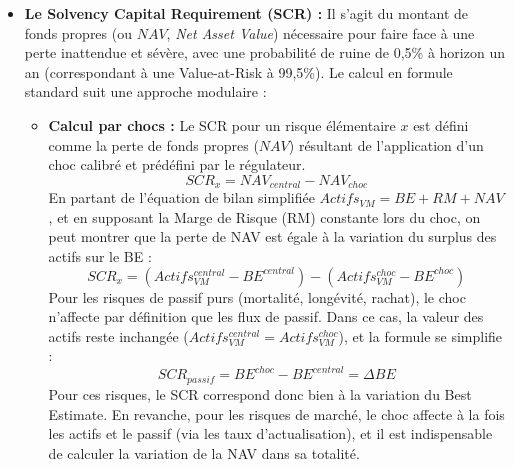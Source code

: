 \begin{itemize}
    \item \textbf{Le Solvency Capital Requirement (SCR) :} Il s'agit du montant de fonds propres (ou $NAV$, \textit{Net Asset Value}) nécessaire pour faire face à une perte inattendue et sévère, avec une probabilité de ruine de 0,5\% à horizon un an (correspondant à une Value-at-Risk à 99,5\%). Le calcul en formule standard suit une approche modulaire :
    \begin{itemize}
        \item \textbf{Calcul par chocs :} Le SCR pour un risque élémentaire $x$ est défini comme la perte de fonds propres ($NAV$) résultant de l'application d'un choc calibré et prédéfini par le régulateur.
        \begin{equation}
            SCR_{x} = NAV_{central} - NAV_{choc}
        \end{equation}
        En partant de l'équation de bilan simplifiée $Actifs_{VM} = BE + RM + NAV$, et en supposant la Marge de Risque (RM) constante lors du choc, on peut montrer que la perte de NAV est égale à la variation du surplus des actifs sur le BE :
        \begin{equation*}
            SCR_{x} = (Actifs_{VM}^{central} - BE^{central}) - (Actifs_{VM}^{choc} - BE^{choc})
        \end{equation*}
        Pour les risques de passif purs (mortalité, longévité, rachat), le choc n'affecte par définition que les flux de passif. Dans ce cas, la valeur des actifs reste inchangée ($Actifs_{VM}^{central} = Actifs_{VM}^{choc}$), et la formule se simplifie :
        \begin{equation*}
            SCR_{passif} = BE^{choc} - BE^{central} = \Delta BE
        \end{equation*}
        Pour ces risques, le SCR correspond donc bien à la variation du Best Estimate. En revanche, pour les risques de marché, le choc affecte à la fois les actifs et le passif (via les taux d'actualisation), et il est indispensable de calculer la variation de la NAV dans sa totalité.\newline{}


\end{itemize}
\end{itemize}
